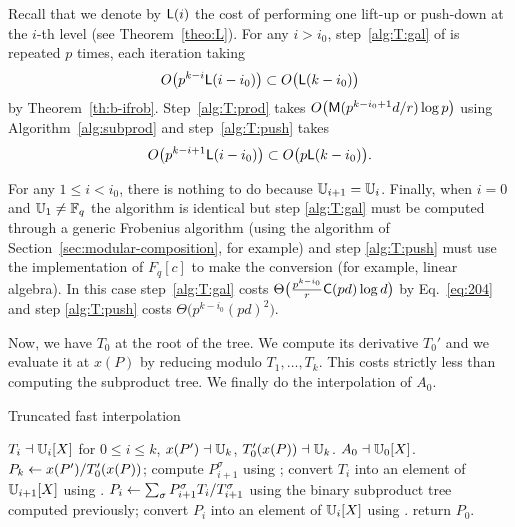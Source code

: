 Recall that we denote by $\mathsf{L}(i)$ the cost of performing one lift-up
or push-down at the $i$-th level (see Theorem~\ref{theo:L}). For any
$i>i_0$, step~\ref{alg:T:gal} of is repeated $p$ times, each iteration
taking 
\[O\bigl(p^{k-i}\mathsf{L}(i-i_0)\bigr) \subset O\bigl(\mathsf{L}(k-i_0)\bigr)\]
by Theorem~\ref{th:b-ifrob}.  Step~\ref{alg:T:prod} takes
$O\bigl(\mathsf{M}(p^{k-i_0+1}d/r)\log p\bigr)$ using
Algorithm~\ref{alg:subprod} and step~\ref{alg:T:push} takes
\[O\bigl(p^{k-i+1}\mathsf{L}(i-i_0)\bigr) \subset
O\bigl(p\mathsf{L}(k-i_0)\bigr)\text{.}\]

For any $1\le i<i_0$, there is nothing to do because
$\mathbb{U}_{i+1}=\mathbb{U}_i$. Finally, when $i=0$ and $\mathbb{U}_1\ne\mathbb{F}_q$ the algorithm
is identical but step \ref{alg:T:gal} must be computed through a
generic Frobenius algorithm (using the algorithm of
Section~\ref{sec:modular-composition}, for example) and step
\ref{alg:T:push} must use the implementation of $F_q[c]$ to make the
conversion (for example, linear algebra). In this case
step~\ref{alg:T:gal} costs
$\Theta\bigl(\frac{p^{k-i_0}}{r}\mathsf{C}(pd)\log d \bigr)$
by Eq.~\eqref{eq:204} and step \ref{alg:T:push} costs
$\Theta\bigl(p^{k-i_0}(pd)^2\bigr)$.

Now, we have $T_0$ at the root of the tree. We compute its derivative
$T_0'$ and we evaluate it at $x(P)$ by reducing modulo
$T_1,\ldots,T_k$. This costs strictly less than computing the
subproduct tree.  We finally do the interpolation of $A_0$.

\begin{algorithm}
  \caption{Truncated fast interpolation}
  \begin{algorithmic}[1]
    \REQUIRE $T_i\dashv\mathbb{U}_i[X]$ for $0\le i\le k$, $x(P')\dashv\mathbb{U}_k$, $T_0'(x(P))\dashv\mathbb{U}_k$.
    \ENSURE $A_0\dashv\mathbb{U}_0[X]$.
    \STATE\label{alg:A}  $P_k \leftarrow x(P')/T_0'(x(P))$;
    \STATE\label{alg:A:gal} compute $P_{i+1}^\sigma$ using \hyperref[alg:iterfrobenius]{};
    \ENDFOR
    \STATE\label{alg:T:lift} convert $T_i$ into an element of $\mathbb{U}_{i+1}[X]$ using \hyperref[alg:liftup]{}.
    \STATE\label{alg:A:CRA} $P_i\leftarrow \sum_{\sigma}P_{i+1}^\sigma T_i/T_{i+1}^\sigma$ using the binary subproduct tree computed previously;
    \STATE\label{alg:A:push} convert  $P_i$ into an element of
    $\mathbb{U}_i[X]$ using \hyperref[alg:push-down]{}.
    \ENDFOR return $P_0$.
  \end{algorithmic}
\end{algorithm}

